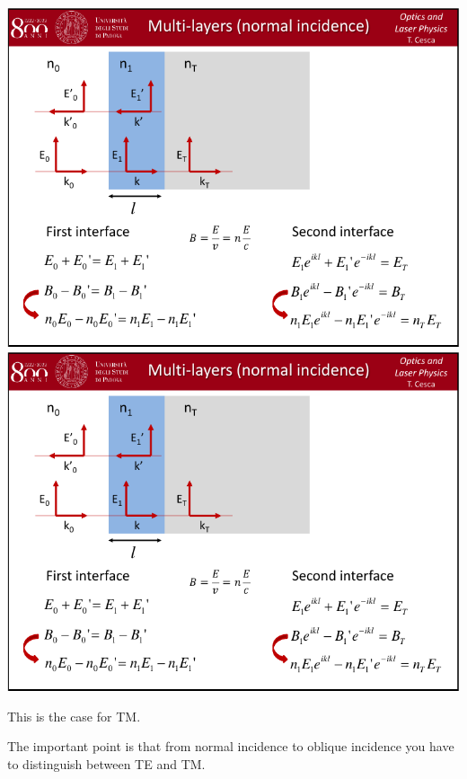 \documentclass[../main/main.tex]{subfiles}
\begin{document}
\begin{minipage}[]{0.5\linewidth}
\centering
\includegraphics[page=15,width=1\textwidth]{../lessons/pdf_file/06_lecture.pdf}
\includegraphics[page=16,width=1\textwidth]{../lessons/pdf_file/06_lecture.pdf}
\end{minipage}
\hspace{0.3cm}\vspace{0.3cm}
\begin{minipage}[c]{0.47\linewidth}

This is the case for TM.

The important point is that from normal incidence to oblique incidence you have to distinguish between TE and TM. 

\end{minipage}
\end{document}

